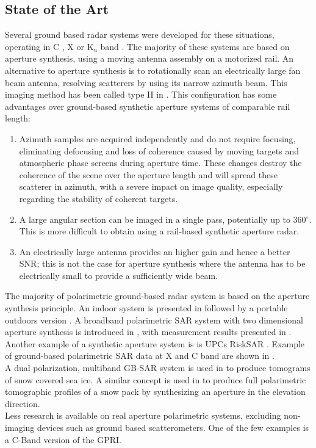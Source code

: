\subsection{State of the Art}
Several ground based radar systems were developed for these situations, operating in C \cite{Leva2003, Rudolf1999a,Kang2009}, X \cite{Aguasca2004,Pipia2007a} or $\mathrm{K_u}$ band \cite{Leva2003, Rudolf1999a,Werner2008, Rodelsperger2012}. The majority of these systems are based on aperture synthesis, using a moving antenna assembly on a motorized rail. 
An alternative to aperture synthesis is to rotationally scan an electrically large fan beam antenna, resolving  scatterers by using its narrow azimuth beam\cite{Werner2008,werner_gpri_2012}. This imaging method has been called type II in \cite{Caduff2015}. 
This configuration has some advantages over ground-based synthetic aperture systems\cite{Monserrat2014} of comparable rail length: \begin{enumerate}
  \item Azimuth samples are acquired independently and do not require focusing, eliminating defocusing and loss of coherence caused by moving targets and atmospheric phase screens during aperture time. 
These changes destroy the coherence of the scene over the aperture length and will spread these scatterer in azimuth, with a severe impact on image quality, especially regarding the stability of coherent targets.\\
 \item A large 
angular section can be imaged in a single pass, potentially up to 360$^{\circ}$. This is more difficult to obtain using a rail-based synthetic aperture radar.\\
\item An electrically large antenna provides an higher gain and hence a better SNR; this is not the case for  aperture synthesis  where the antenna has to be electrically small to provide a sufficiently wide beam.\\
\end{enumerate}
The majority of polarimetric ground-based radar system is based on the aperture synthesis principle. An indoor system is presented in \cite{Bennett1996} followed by a portable outdoors version \cite{Bennett2000}. A broadband polarimetric SAR system with two dimensional aperture synthesis is introduced in \cite{Zhou2004}, with measurement results presented in \cite{Hamasaki2005}.
Another example  of a synthetic aperture system is is UPCs RiskSAR \cite{Iglesias2014, Aguasca2004,Pipia2007a,Pipia2009, Pipia2013,Iglesias2014}. Example of ground-based polarimetric SAR data at X and C band are shown in \cite{Kang2009, Kang2010}.\\ A dual polarization, multiband GB-SAR system is used in \cite{Yitayew2014} to produce tomograms of snow covered sea ice. A similar concept is used in\cite{Frey2015,Frey2016} to produce full polarimetric tomographic profiles of a snow pack by synthesizing an aperture in the elevation direction.\\
Less research is available on real aperture polarimetric systems, excluding non-imaging devices such as ground based scatterometers. One of the few examples is a C-Band version of the GPRI\cite{Cherukumilli2012}.
